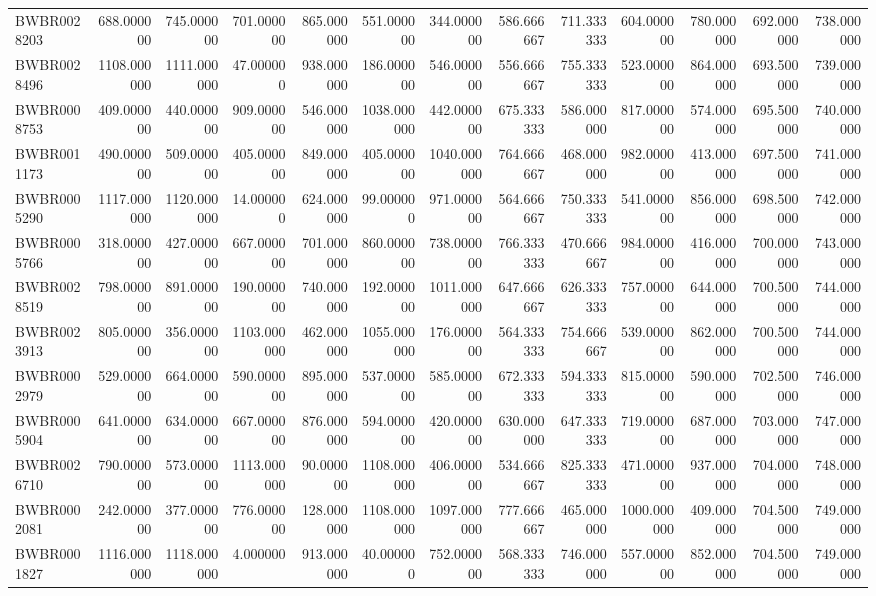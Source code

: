 \begin{longtable}{lrrrrrrrrrrrr}
BWBR0028203 & 688.000000 & 745.000000 & 701.000000 & 865.000000 & 551.000000 & 344.000000 & 586.666667 & 711.333333 & 604.000000 & 780.000000 & 692.000000 & 738.000000 \\
BWBR0028496 & 1108.000000 & 1111.000000 & 47.000000 & 938.000000 & 186.000000 & 546.000000 & 556.666667 & 755.333333 & 523.000000 & 864.000000 & 693.500000 & 739.000000 \\
BWBR0008753 & 409.000000 & 440.000000 & 909.000000 & 546.000000 & 1038.000000 & 442.000000 & 675.333333 & 586.000000 & 817.000000 & 574.000000 & 695.500000 & 740.000000 \\
BWBR0011173 & 490.000000 & 509.000000 & 405.000000 & 849.000000 & 405.000000 & 1040.000000 & 764.666667 & 468.000000 & 982.000000 & 413.000000 & 697.500000 & 741.000000 \\
BWBR0005290 & 1117.000000 & 1120.000000 & 14.000000 & 624.000000 & 99.000000 & 971.000000 & 564.666667 & 750.333333 & 541.000000 & 856.000000 & 698.500000 & 742.000000 \\
BWBR0005766 & 318.000000 & 427.000000 & 667.000000 & 701.000000 & 860.000000 & 738.000000 & 766.333333 & 470.666667 & 984.000000 & 416.000000 & 700.000000 & 743.000000 \\
BWBR0028519 & 798.000000 & 891.000000 & 190.000000 & 740.000000 & 192.000000 & 1011.000000 & 647.666667 & 626.333333 & 757.000000 & 644.000000 & 700.500000 & 744.000000 \\
BWBR0023913 & 805.000000 & 356.000000 & 1103.000000 & 462.000000 & 1055.000000 & 176.000000 & 564.333333 & 754.666667 & 539.000000 & 862.000000 & 700.500000 & 744.000000 \\
BWBR0002979 & 529.000000 & 664.000000 & 590.000000 & 895.000000 & 537.000000 & 585.000000 & 672.333333 & 594.333333 & 815.000000 & 590.000000 & 702.500000 & 746.000000 \\
BWBR0005904 & 641.000000 & 634.000000 & 667.000000 & 876.000000 & 594.000000 & 420.000000 & 630.000000 & 647.333333 & 719.000000 & 687.000000 & 703.000000 & 747.000000 \\
BWBR0026710 & 790.000000 & 573.000000 & 1113.000000 & 90.000000 & 1108.000000 & 406.000000 & 534.666667 & 825.333333 & 471.000000 & 937.000000 & 704.000000 & 748.000000 \\
BWBR0002081 & 242.000000 & 377.000000 & 776.000000 & 128.000000 & 1108.000000 & 1097.000000 & 777.666667 & 465.000000 & 1000.000000 & 409.000000 & 704.500000 & 749.000000 \\
BWBR0001827 & 1116.000000 & 1118.000000 & 4.000000 & 913.000000 & 40.000000 & 752.000000 & 568.333333 & 746.000000 & 557.000000 & 852.000000 & 704.500000 & 749.000000 \\

\end{longtable}
